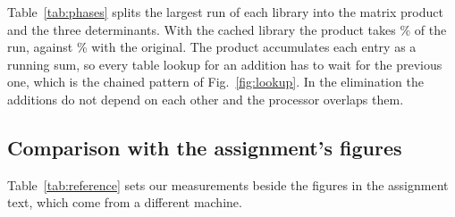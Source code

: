 Table~\ref{tab:phases} splits the largest run of each library into the matrix product and
the three determinants. With the cached library the product takes \SeqCachedProductShare\%
of the run, against \SeqOriginalProductShare\% with the original. The product accumulates each entry as a running
sum, so every table lookup for an addition has to wait for the previous one, which is the
chained pattern of Fig.~\ref{fig:lookup}. In the elimination the additions do not depend on
each other and the processor overlaps them.

\begin{table}[t]
  \caption{Time in the matrix product and in the three determinants, for the largest run
  of each library.}
  \label{tab:phases}
  \centering
  \footnotesize
  
\end{table}

\subsection{Comparison with the assignment's figures}

Table~\ref{tab:reference} sets our measurements beside the figures in the assignment text,
which come from a different machine. \SeqReferenceNote

\begin{table}[t]
  \caption{The assignment's reference figures (Apple M3 Max) and our measurements on
  \SequentialMachine.}
  \label{tab:reference}
  \centering
  \footnotesize
  
\end{table}
